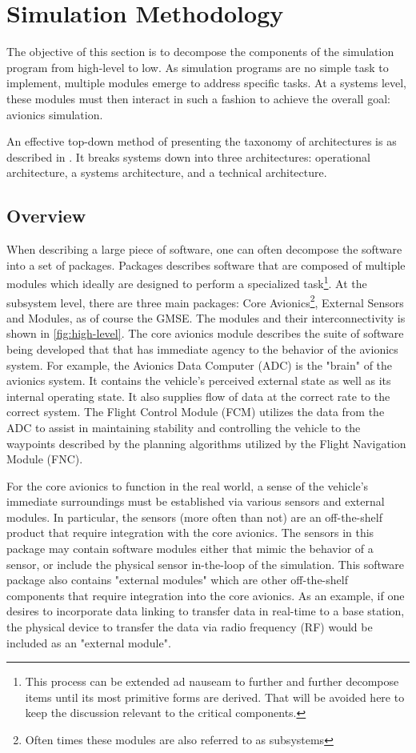 \section{Simulation Methodology}
\label{sec:sim-method}

The objective of this section is to decompose the components of the simulation program from
high-level to low. As simulation programs are no simple task to implement, multiple modules emerge
to address specific tasks. At a systems level, these modules must then interact in such a fashion to
achieve the overall goal: avionics simulation.

An effective top-down method of presenting the taxonomy of architectures is as described in
\cite{levis_c4isr_2000}. It breaks systems down into three architectures: operational architecture, a systems architecture, and a technical architecture.

\subsection{Overview}
When describing a large piece of software, one can often decompose the software into a set of
packages. Packages describes software that are composed of multiple modules which ideally are
designed to perform a specialized task\footnote{This process can be extended ad nauseam to
further and further decompose items until its most primitive forms are derived. That will be avoided
here to keep the discussion relevant to the critical components.}. At the
subsystem level, there are three main packages: Core Avionics\footnote{Often times these modules are also referred to as
subsystems}, External Sensors and Modules, as of
course the GMSE. The modules and their interconnectivity is shown in \autoref{fig:high-level}. The
core avionics module describes the suite of software being developed that that has immediate agency
to the behavior of the avionics system. For example, the Avionics Data Computer (ADC) is the "brain"
of the avionics system. It contains the vehicle's perceived external state as well as its internal
operating state. It also supplies flow of data at the correct rate to the correct system. The Flight
Control Module (FCM) utilizes the data from the ADC to assist in maintaining stability and
controlling the vehicle to the waypoints described by the planning algorithms utilized by the
Flight Navigation Module (FNC).

For the core avionics to function in the real world, a sense of the vehicle's immediate surroundings
must be established via various sensors and external modules. In particular, the sensors (more often
than not) are an off-the-shelf product that require integration with the core avionics. The sensors
in this package may contain software modules either that mimic the behavior of a sensor, or include
the physical sensor in-the-loop of the simulation. This software package also contains "external
modules" which are other off-the-shelf components that require integration into the core avionics.
As an example, if one desires to incorporate data linking to transfer data in real-time to a base
station, the physical device to transfer the data via radio frequency (RF) would be included as an
"external module".

